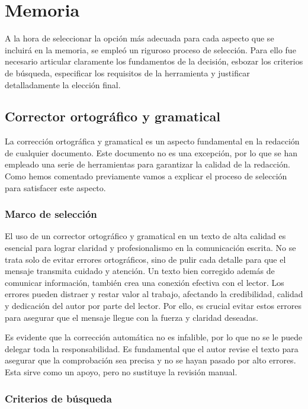 \section{Memoria}

A la hora de seleccionar la opción más adecuada para cada aspecto que se incluirá en la memoria, se empleó un riguroso proceso de selección. Para ello fue necesario articular claramente los fundamentos de la decisión, esbozar los criterios de búsqueda, especificar los requisitos de la herramienta y justificar detalladamente la elección final.

\subsection{Corrector ortográfico y gramatical}

La corrección ortográfica y gramatical es un aspecto fundamental en la redacción de cualquier documento. Este documento no es una excepción, por lo que se han empleado una serie de herramientas para garantizar la calidad de la redacción. Como hemos comentado previamente vamos a explicar el proceso de selección para satisfacer este aspecto.

\subsubsection{Marco de selección}

El uso de un corrector ortográfico y gramatical en un texto de alta calidad es esencial para lograr claridad y profesionalismo en la comunicación escrita. No se trata solo de evitar errores ortográficos, sino de pulir cada detalle para que el mensaje transmita cuidado y atención. Un texto bien corregido además de comunicar información, también crea una conexión efectiva con el lector. Los errores pueden distraer y restar valor al trabajo, afectando la credibilidad, calidad y dedicación del autor por parte del lector. Por ello, es crucial evitar estos errores para asegurar que el mensaje llegue con la fuerza y claridad deseadas.

Es evidente que la corrección automática no es infalible, por lo que no se le puede delegar toda la responsabilidad. Es fundamental que el autor revise el texto para asegurar que la comprobación sea precisa y no se hayan pasado por alto errores. Esta sirve como un apoyo, pero no sustituye la revisión manual.

\subsubsection{Criterios de búsqueda}

